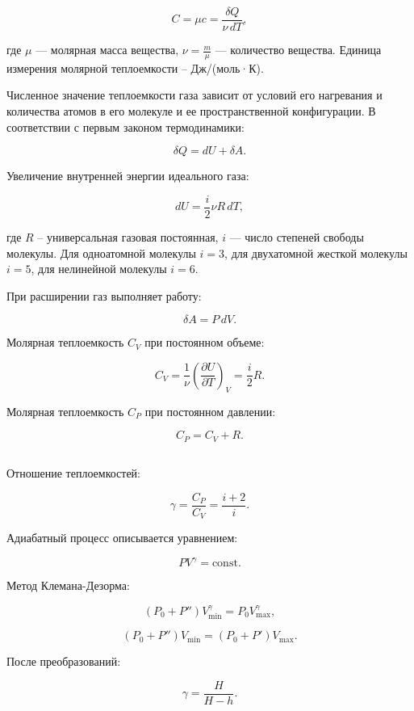 \documentclass[a4paper]{article}
\begin{document}
\[
C = \mu c = \frac{\delta Q}{\nu \, dT},
\]


где \(\mu\) — молярная масса вещества, \(\nu = \frac{m}{\mu}\) — количество вещества. Единица измерения молярной теплоемкости – Дж/(моль·К).

Численное значение теплоемкости газа зависит от условий его нагревания и количества атомов в его молекуле и ее пространственной конфигурации. В соответствии с первым законом термодинамики:

\[
\delta Q = dU + \delta A.
\]


Увеличение внутренней энергии идеального газа:

\[
dU = \frac{i}{2} \nu R \, dT,
\]


где \(R\) – универсальная газовая постоянная, \(i\) — число степеней свободы молекулы. Для одноатомной молекулы \(i = 3\), для двухатомной жесткой молекулы \(i = 5\), для нелинейной молекулы \(i = 6\).

При расширении газ выполняет работу:

\[
\delta A = P \, dV.
\]


Молярная теплоемкость \(C_V\) при постоянном объеме:

\[
C_V = \frac{1}{\nu} \left( \frac{\partial U}{\partial T} \right)_V = \frac{i}{2} R.
\]


Молярная теплоемкость \(C_P\) при постоянном давлении:

\[
C_P = C_V + R.
\]


\subsection*{}
Отношение теплоемкостей:

\[
\gamma = \frac{C_P}{C_V} = \frac{i + 2}{i}.
\]


Адиабатный процесс описывается уравнением:

\[
PV^\gamma = \text{const}.
\]


Метод Клемана-Дезорма:

\[
(P_0 + P'')V_{\text{min}}^\gamma = P_0 V_{\text{max}}^\gamma,
\]


\[
(P_0 + P'')V_{\text{min}} = (P_0 + P')V_{\text{max}}.
\]


После преобразований:

\[
\gamma = \frac{H}{H - h}.
\]


\end{document}
